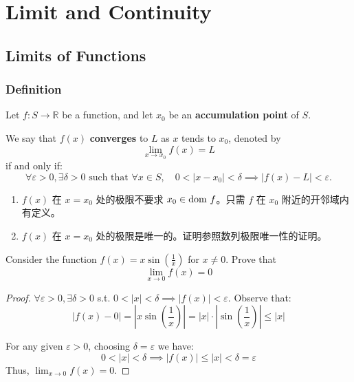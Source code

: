 \documentclass[
	UTF-8,
	11pt, %
	a4paper, %
]{LegrandOrangeBook}
\begin{document}
    \newpage

    \chapter{Limit and Continuity}

    \section{Limits of Functions}

    \subsection{Definition}

    \begin{definition}

    Let $f: S \to \mathbb{R}$ be a function, and let $x_0$ be an \textbf{accumulation point} of $S$.

    We say that $f(x)$ \textbf{converges} to $L$ as $x$ tends to $x_0$, 
    denoted by $$\lim_{x \to x_0} f(x) = L$$ if and only if:
    \[
    \forall \varepsilon > 0, \exists \delta > 0 \text{ such that } \forall x \in S, \quad 0 < |x - x_0| < \delta \implies |f(x) - L| < \varepsilon.
    \]
    \end{definition}

    \begin{remark}
        \begin{enumerate}
            \item $f(x)$ 在 $x=x_0$ 处的极限不要求 $x_0 \in \mathrm{dom}\  f$。只需 $f$ 在 $x_0$ 附近的开邻域内有定义。
            \item $f(x)$ 在 $x=x_0$ 处的极限是唯一的。证明参照数列极限唯一性的证明。
        \end{enumerate}
    \end{remark}

    \begin{example}
    Consider the function $f(x) = x \sin\left(\frac{1}{x}\right)$ for $x \neq 0$. 
    Prove that $$\lim_{x \to 0} f(x) = 0$$

    \begin{proof}
        $\forall \varepsilon > 0, \exists \delta > 0$ s.t. $0 < |x| < \delta \implies |f(x)| < \varepsilon$.
        Observe that:
        \[
        |f(x) - 0| = \left| x \sin\left(\frac{1}{x}\right) \right| 
        = |x| \cdot \left| \sin\left(\frac{1}{x}\right) \right| \leq |x|
        \]
    
        For any given $\varepsilon > 0$, choosing $\delta = \varepsilon$ we have:
        \[
        0 < |x| < \delta \implies |f(x)| \le |x| < \delta = \varepsilon
        \]
        Thus, $\displaystyle\lim_{x \to 0} f(x) = 0$.
    \end{proof}
    \end{example}
\end{document}
